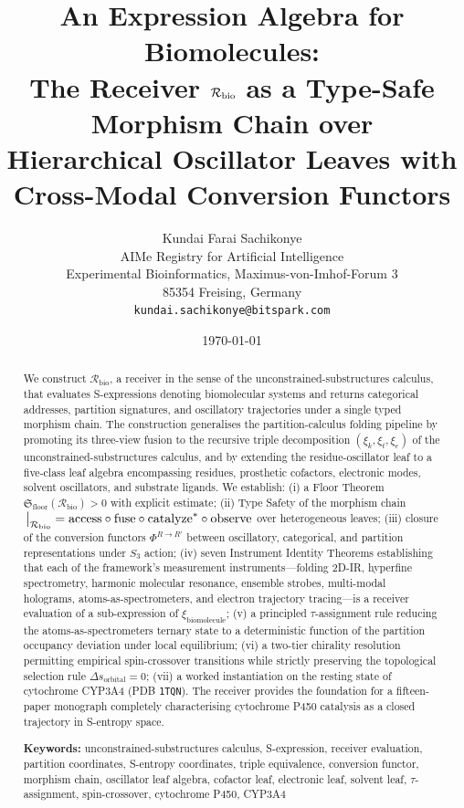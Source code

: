 \documentclass[11pt,twocolumn,a4paper]{article}
\title{\textbf{An Expression Algebra for Biomolecules:\\
The Receiver $\Recv_{\mathrm{bio}}$ as a Type-Safe Morphism Chain over\\
Hierarchical Oscillator Leaves with Cross-Modal Conversion Functors}}
\author{
Kundai Farai Sachikonye\\[0.3em]
AIMe Registry for Artificial Intelligence\\
Experimental Bioinformatics, Maximus-von-Imhof-Forum 3\\
85354 Freising, Germany\\
\texttt{kundai.sachikonye@bitspark.com}
}
\date{\today}
\theoremstyle{definition}
\theoremstyle{remark}
\newcommand{\Recv}{\mathcal{R}}
\newcommand{\Floor}{{\mathfrak{S}_{\mathrm{floor}}}}
\newcommand{\Sexp}{\xi}
\begin{document}
\maketitle

\begin{abstract}
We construct $\Recv_{\mathrm{bio}}$, a receiver in the sense of the unconstrained-substructures calculus, that evaluates S-expressions denoting biomolecular systems and returns categorical addresses, partition signatures, and oscillatory trajectories under a single typed morphism chain. The construction generalises the partition-calculus folding pipeline by promoting its three-view fusion to the recursive triple decomposition $(\Sexp_k, \Sexp_t, \Sexp_e)$ of the unconstrained-substructures calculus, and by extending the residue-oscillator leaf to a five-class leaf algebra encompassing residues, prosthetic cofactors, electronic modes, solvent oscillators, and substrate ligands. We establish: (i) a Floor Theorem $\Floor(\Recv_{\mathrm{bio}}) > 0$ with explicit estimate; (ii) Type Safety of the morphism chain $\eval_{\Recv_{\mathrm{bio}}} = \mathrm{access} \circ \mathrm{fuse} \circ \mathrm{catalyze}^* \circ \mathrm{observe}$ over heterogeneous leaves; (iii) closure of the conversion functors $\Phi^{R \to R'}$ between oscillatory, categorical, and partition representations under $S_3$ action; (iv) seven Instrument Identity Theorems establishing that each of the framework's measurement instruments---folding 2D-IR, hyperfine spectrometry, harmonic molecular resonance, ensemble strobes, multi-modal holograms, atoms-as-spectrometers, and electron trajectory tracing---is a receiver evaluation of a sub-expression of $\Sexp_{\mathrm{biomolecule}}$; (v) a principled $\tau$-assignment rule reducing the atoms-as-spectrometers ternary state to a deterministic function of the partition occupancy deviation under local equilibrium; (vi) a two-tier chirality resolution permitting empirical spin-crossover transitions while strictly preserving the topological selection rule $\Delta s_{\mathrm{orbital}} = 0$; (vii) a worked instantiation on the resting state of cytochrome CYP3A4 (PDB \texttt{1TQN}). The receiver provides the foundation for a fifteen-paper monograph completely characterising cytochrome P450 catalysis as a closed trajectory in S-entropy space.

\medskip
\noindent\textbf{Keywords:} unconstrained-substructures calculus, S-expression, receiver evaluation, partition coordinates, S-entropy coordinates, triple equivalence, conversion functor, morphism chain, oscillator leaf algebra, cofactor leaf, electronic leaf, solvent leaf, $\tau$-assignment, spin-crossover, cytochrome P450, CYP3A4
\end{abstract}
\end{document}
